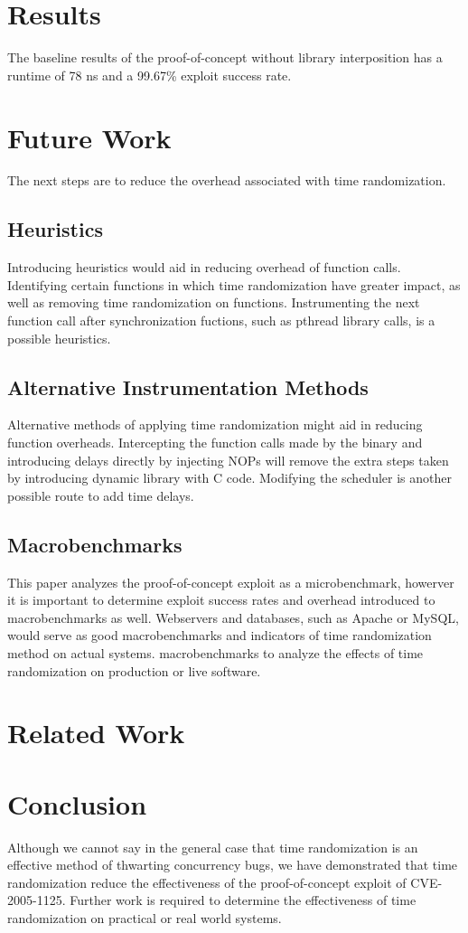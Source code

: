 \documentclass[letterpaper,twocolumn,10pt]{article}
\begin{document}
\section{Results}
The baseline results of the proof-of-concept without library interposition has a runtime of 78 ns and a 99.67\% exploit success rate.  %
\section{Future Work}
The next steps are to reduce the overhead associated with time randomization.
\subsection{Heuristics}
Introducing heuristics would aid in reducing overhead of function calls.  Identifying certain functions in which time randomization have greater impact, as well as removing time randomization on functions. Instrumenting the next function call after synchronization fuctions, such as pthread library calls, is a possible heuristics.  
\subsection{Alternative Instrumentation Methods}
Alternative methods of applying time randomization might aid in reducing function overheads.  Intercepting the function calls made by the binary and introducing delays directly by injecting NOPs will remove the extra steps taken by introducing dynamic library with C code.  Modifying the scheduler is another possible route to add time delays.
\subsection{Macrobenchmarks}
This paper analyzes the proof-of-concept exploit as a microbenchmark, howerver it is important to determine exploit success rates and overhead introduced to macrobenchmarks as well. Webservers and databases, such as Apache or MySQL, would serve as good macrobenchmarks and indicators of time randomization method on actual systems.
macrobenchmarks to analyze the effects of time randomization on production or live software.
\section{Related Work}

\section{Conclusion}
Although we cannot say in the general case that time randomization is an effective method of thwarting concurrency bugs, we have demonstrated that time randomization reduce the effectiveness of the proof-of-concept exploit of CVE-2005-1125.  Further work is required to determine the effectiveness of time randomization on practical or real world systems.
\end{document}
